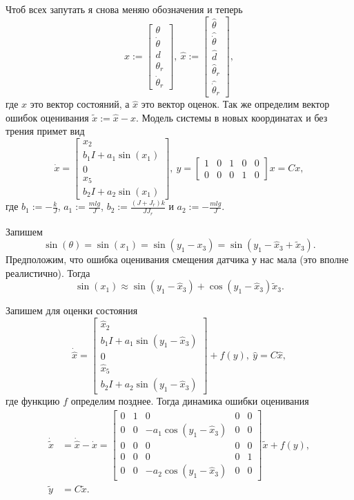 \documentclass{article}
\begin{document}
Чтоб всех запутать я снова меняю обозначения и теперь
\begin{equation} \label{eq:FullState}
	x:=\begin{bmatrix} \theta \\ \dot{\theta} \\ d \\ \theta_r \\\dot{\theta}_r \end{bmatrix}, \ 
	\hat{x}:=\begin{bmatrix} \hat{\theta} \\ \hat{\dot{\theta}} \\ \hat{d} \\ \hat{\theta}_r \\ \hat{\dot{\theta}}_r \end{bmatrix},
\end{equation}
где $x$ это вектор состояний, а $\hat{x}$ это вектор оценок. Так же определим вектор ошибок оценивания $\tilde{x}:=\hat{x}-x$. Модель системы в новых координатах и без трения примет вид
\[
	\dot{x} = \begin{bmatrix} x_2 \\ b_1I +a_1\sin(x_1) \\ 0 \\ x_5 \\ b_2I +a_2\sin(x_1) \end{bmatrix}, \ 
	y=\begin{bmatrix} 1 & 0 & 1 & 0 & 0 \\ 0 & 0 & 0 & 1 & 0 \end{bmatrix}x = Cx,
\]
где $b_1:=-\frac{k}{J}$, $a_1:=\frac{mlg}{J}$, $b_2:=\frac{(J+J_r)k}{JJ_r}$ и $a_2:=- \frac{mlg}{J}$.

Запишем
\[
	\sin(\theta) = \sin(x_1) = \sin(y_1-x_3) = \sin(y_1-\hat{x}_3+\tilde{x}_3).
\]
Предположим, что ошибка оценивания смещения датчика у нас мала (это вполне реалистично). Тогда
\[
	\sin(x_1) \approx \sin(y_1-\hat{x}_3) + \cos(y_1-\hat{x}_3)\tilde{x}_3.
\]

Запишем для оценки состояния
\[
	\dot{\hat{x}} = \begin{bmatrix} \hat{x}_2 \\ b_1I +a_1\sin(y_1-\hat{x}_3) \\ 0 \\ \hat{x}_5 \\ b_2I +a_2\sin(y_1-\hat{x}_3) \end{bmatrix} + f(y),
	\ \hat{y} = C\hat{x},
\]
где функцию $f$ определим позднее. Тогда динамика ошибки оценивания
\[
	\begin{aligned}
		\dot{\tilde{x}} &= \dot{\hat{x}} - \dot{x} = \begin{bmatrix} 0 & 1 & 0 					 & 0 & 0 \\
										  0 & 0 &-a_1\cos(y_1-\hat{x}_3) & 0 & 0 \\
										  0 & 0 & 0 					 & 0 & 0 \\
										  0 & 0 & 0						 & 0 & 1 \\
										  0 & 0 &-a_2\cos(y_1-\hat{x}_3) & 0 & 0
						 \end{bmatrix}\tilde{x} + f(y), \\
		\tilde{y} &= C\tilde{x}.
	\end{aligned}
\]
\end{document}
